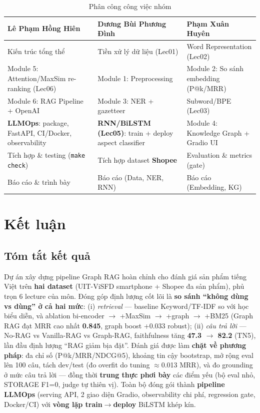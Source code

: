 \documentclass[12pt,a4paper]{article}
\begin{document}
\begin{table}[H]
\centering
\caption{Phân công công việc nhóm}
\renewcommand{\arraystretch}{1.4}
\begin{tabular}{p{4cm}p{4.5cm}p{4.5cm}}
\toprule
\textbf{Lê Phạm Hồng Hiên} \newline 22110059 \newline \textit{} 
& \textbf{Dương Bùi Phương Đình} \newline 22110049
& \textbf{Phạm Xuân Huyên} \newline 22110076 \\
\midrule
Kiến trúc tổng thể & Tiền xử lý dữ liệu (Lec01) & Word Representation (Lec02) \\
Module 5: Attention/MaxSim re-ranking (Lec06) & Module 1: Preprocessing & Module 2: So sánh embedding (P@k/MRR) \\
Module 6: RAG Pipeline + OpenAI & Module 3: NER + gazetteer & Subword/BPE (Lec03) \\
\textbf{LLMOps}: package, FastAPI, CI/Docker, observability & \textbf{RNN/BiLSTM (Lec05)}: train + deploy aspect classifier & Module 4: Knowledge Graph + Gradio UI \\
Tích hợp \& testing (\texttt{make check}) & Tích hợp dataset \textbf{Shopee} & Evaluation \& metrics (gate) \\
Báo cáo \& trình bày & Báo cáo (Data, NER, RNN) & Báo cáo (Embedding, KG) \\
\bottomrule
\end{tabular}
\end{table}

\section{Kết luận}

\subsection{Tóm tắt kết quả}
Dự án xây dựng pipeline Graph RAG hoàn chỉnh cho đánh giá sản phẩm tiếng Việt trên \textbf{hai dataset} (UIT-ViSFD smartphone + Shopee đa sản phẩm), phủ trọn 6 lecture của môn. Đóng góp định lượng cốt lõi là \textbf{so sánh ``không dùng vs dùng'' ở cả hai mức}: (i) \textit{retrieval} --- baseline Keyword/TF-IDF so với học biểu diễn, và ablation bi-encoder $\to$ +MaxSim $\to$ +graph $\to$ +BM25 (Graph RAG đạt MRR cao nhất \textbf{0.845}, graph boost +0.033 robust); (ii) \textit{câu trả lời} --- No-RAG vs Vanilla-RAG vs Graph-RAG, faithfulness tăng \textbf{47.3 $\to$ 82.2} (TN5), lần đầu định lượng ``RAG giảm bịa đặt''. Đánh giá được làm \textbf{chặt về phương pháp}: đa chỉ số (P@k/MRR/NDCG@5), khoảng tin cậy bootstrap, mở rộng eval lên 100 câu, tách dev/test (đo overfit do tuning $\approx$0.013 MRR), và đo grounding ở mức câu trả lời --- đồng thời \textbf{trung thực phơi bày} các điểm yếu (bộ eval nhỏ, STORAGE F1=0, judge tự thiên vị). Toàn bộ đóng gói thành \textbf{pipeline LLMOps} (serving API, 2 giao diện Gradio, observability chi phí, regression gate, Docker/CI) với \textbf{vòng lặp train$\to$deploy} BiLSTM khép kín.
\end{document}
